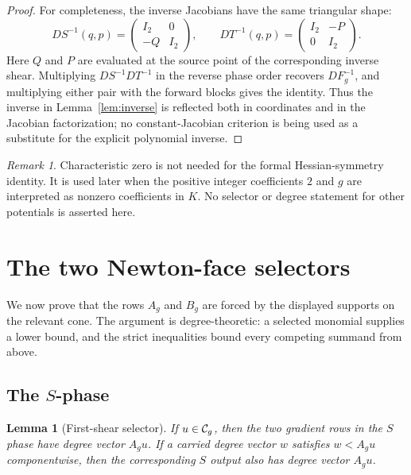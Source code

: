 \documentclass[11pt]{article}
\newtheorem{lemma}[theorem]{Lemma}
\theoremstyle{remark}
\newtheorem{remark}[theorem]{Remark}
\numberwithin{equation}{section}
\begin{document}
\begin{proof}
For completeness, the inverse Jacobians have the same triangular shape:
\[
 DS^{-1}(q,p)=
 \begin{pmatrix}I_2&0\\-Q&I_2\end{pmatrix},
 \qquad
 DT^{-1}(q,p)=
 \begin{pmatrix}I_2&-P\\0&I_2\end{pmatrix}.
\]
Here \(Q\) and \(P\) are evaluated at the source point of the corresponding
inverse shear.  Multiplying \(DS^{-1}DT^{-1}\) in the reverse phase order
recovers \(DF_g^{-1}\), and multiplying either pair with the forward blocks
gives the identity.  Thus the inverse in Lemma~\ref{lem:inverse} is reflected
both in coordinates and in the Jacobian factorization; no constant-Jacobian
criterion is being used as a substitute for the explicit polynomial inverse.

\end{proof}

\begin{remark}
Characteristic zero is not needed for the formal Hessian-symmetry identity.
It is used later when the positive integer coefficients \(2\) and \(g\) are
interpreted as nonzero coefficients in \(K\).  No selector or degree statement
for other potentials is asserted here.
\end{remark}

\section{The two Newton-face selectors}\label{sec:selectors}

We now prove that the rows \(A_g\) and \(B_g\) are forced by the displayed
supports on the relevant cone.  The argument is degree-theoretic: a selected
monomial supplies a lower bound, and the strict inequalities bound every
competing summand from above.

\subsection{The \(S\)-phase}

\begin{lemma}[First-shear selector]\label{lem:Sselector}
If $u\in\mathcal{C}_g$, then the two gradient rows in the $S$ phase have degree
vector $A_gu$.  If a carried degree vector $w$ satisfies
$w<A_gu$ componentwise, then the corresponding $S$ output also has degree
vector $A_gu$.
\end{lemma}
\end{document}

